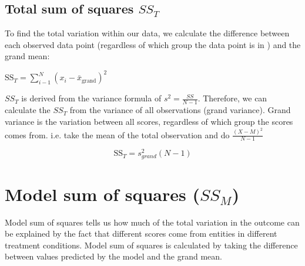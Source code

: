 \subsection{Total sum of squares $SS_{T}$}
To find the total variation within our data, we calculate the difference between each observed data point (regardless of which group the data point is in ) and the grand mean:
\begin{center}
$\text{SS}_T = \sum^N_{i-1} (x_i - \bar{x}_\text{grand})^2$
\end{center}
$SS_T$ is derived from the variance formula of $s^2 = \frac{SS}{N-1}$. Therefore, we can calculate the $SS_T$ from the variance of all observations (grand variance). Grand variance is the variation between all scores, regardless of which group the scores comes from. i.e. take the mean of the total observation and do $\frac{(X-M)^2}{N-1}$

\begin{equation}
\text{SS}_T = s^2_{grand}(N-1)
\end{equation}

\section{Model sum of squares ($SS_M$)}
Model sum of squares tells us how much of the total variation in the outcome can be explained by the fact that different scores come from entities in different treatment conditions. Model sum of squares is calculated by taking the difference between values predicted by the model and the grand mean. 

